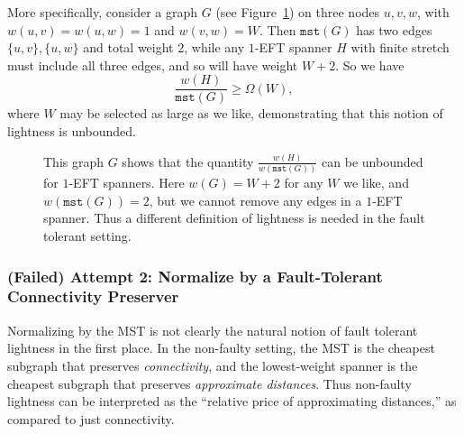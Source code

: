 \documentclass{article}
\newif\ifshort
\theoremstyle{plain}
\theoremstyle{definition}
\newcommand{\mst}{\texttt{mst}}
\begin{document}
More specifically, consider a graph $G$ \ifshort \else (see Figure~\ref{fig:badtriangle}) \fi on three nodes $u,v,w$, with $w(u,v) = w(u,w) = 1$ and $w(v,w) = W$.  Then $\mst(G)$ has two edges $\{u,v\}, \{u,w\}$ and total weight $2$, while any $1$-EFT spanner $H$ with finite stretch must include all three edges, and so will have weight $W+2$.
So we have
$$\frac{w(H)}{\mst(G)} \ge \Omega(W),$$
where $W$ may be selected as large as we like, demonstrating that this notion of lightness is unbounded.


\ifshort
\else
\begin{figure}[t]
\begin{center}
\end{center}
\caption{\label{fig:badtriangle} This graph $G$ shows that the quantity $\frac{w(H)}{w(\mst(G))}$ can be unbounded for $1$-EFT spanners.
Here $w(G) = W+2$ for any $W$ we like, and $w(\mst(G))=2$, but we cannot remove any edges in a $1$-EFT spanner.  Thus a different definition of lightness is needed in the fault tolerant setting.}
\end{figure}
\fi

\subsubsection{(Failed) Attempt 2: Normalize by a Fault-Tolerant Connectivity Preserver}

Normalizing by the MST is not clearly the natural notion of fault tolerant lightness in the first place.
In the non-faulty setting, the MST is the cheapest subgraph that preserves \emph{connectivity}, and the lowest-weight spanner is the cheapest subgraph that preserves \emph{approximate distances}.
Thus non-faulty lightness can be interpreted as the ``relative price of approximating distances,'' as compared to just connectivity.
\end{document}
